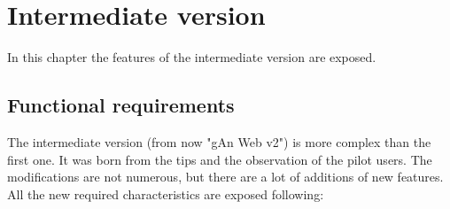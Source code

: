 
\chapter{Intermediate version} %

\label{Chapter4} %

In this chapter the features of the intermediate version are exposed.

\section{Functional requirements}

The intermediate version (from now "gAn Web v2") is more complex than the first one. It was born from the tips and the observation of the pilot users. The modifications are not numerous, but there are a lot of additions of new features. All the new required characteristics are exposed following:

